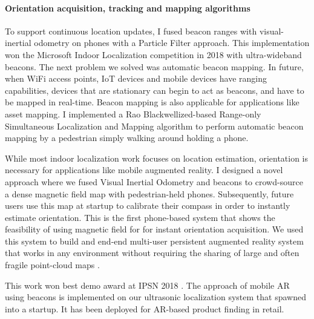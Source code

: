 \documentclass[10pt]{article}
\begin{document}
\paragraph{Orientation acquisition, tracking and mapping algorithms}


To support continuous location updates, I fused beacon ranges with visual-inertial odometry on phones with a Particle Filter approach. This implementation won the Microsoft Indoor Localization competition in 2018 with ultra-wideband beacons. The next problem we solved was automatic beacon mapping. In future, when WiFi access points, IoT devices and mobile devices have ranging capabilities, devices that are stationary can begin to act as beacons, and have to be mapped in real-time. Beacon mapping is also applicable for applications like asset mapping. I implemented a Rao Blackwellized-based Range-only Simultaneous Localization and Mapping algorithm to perform automatic beacon mapping by a pedestrian simply walking around holding a phone. 

While most indoor localization work focuses on location
estimation, orientation is necessary for applications like mobile
augmented reality. %
I designed a novel approach where we fused Visual
Inertial Odometry and beacons to crowd-source a dense magnetic field
map with pedestrian-held phones. Subsequently, future users use this map at startup to calibrate
their compass in order to instantly estimate orientation. %
This is the first phone-based system that shows the feasibility of using magnetic field for
for instant orientation acquisition. %
We used
this system to build and end-end multi-user persistent augmented
reality system that works in any environment without requiring the
sharing of large and often fragile point-cloud maps \cite{mobileAR}. 

This work won best demo award at IPSN 2018 \cite{rajagopal2018welcome}. The approach of mobile AR using beacons is implemented on our ultrasonic localization system that spawned into a startup. It has been deployed for AR-based product finding in retail. 

\end{document}
